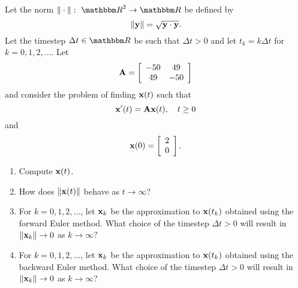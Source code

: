 Let the norm $\norm{\cdot}:\mbox{ }\R^2\rightarrow\R$ be defined by
\[
\|{\bf y}\| = \sqrt{{\bf y}\cdot {\bf y}}.
\]
Let the timestep $\Delta t\in\R$ be such that $\Delta t>0$ and let $t_k=k\Delta t$ for $k=0,1,2,\ldots$. Let
\[
{\bf A} = \left[\begin{array}{cc}-50 & 49 \cr 49 & -50\end{array}\right]
\]
and consider the problem of finding ${\bf x}(t)$ such that
\[
{\bf x}'(t) = {\bf A}{\bf x}(t),\quad t\ge 0
\]
and
\[
{\bf x}(0) = \left[\begin{array}{c}2 \\ 0\end{array}\right].
\]
\begin{enumerate}
\item Compute ${\bf x}(t)$.
\\
\item How does $\|{\bf x}(t)\|$ behave as $t\to\infty$?
\\
\item For $k=0,1,2,\ldots$, let ${\bf x}_k$ be the approximation to ${\bf x}(t_k)$ obtained using the forward Euler method. What choice of the timestep $\Delta t>0$ will result in $\|{\bf x}_k\|\rightarrow 0$ as $k\rightarrow\infty$?
\\
\item For $k=0,1,2,\ldots$, let ${\bf x}_k$ be the approximation to ${\bf x}(t_k)$ obtained using the backward Euler method. What choice of the timestep $\Delta t>0$ will result in $\|{\bf x}_k\|\rightarrow 0$ as $k\rightarrow\infty$?
\end{enumerate}

